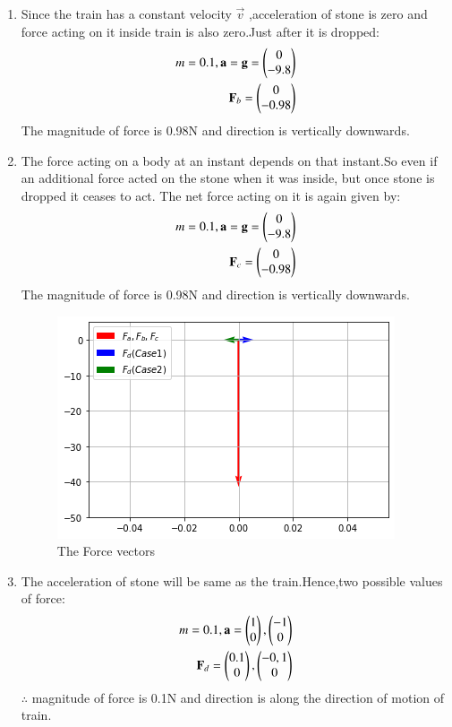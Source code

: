 \documentclass[journal,12pt,twocolumn]{IEEEtran}
\begin{document}
\begin{enumerate}[label=(\alph*)]
   \item
   Since the train has a constant velocity $\vec{v}$ ,acceleration of stone is zero and force acting on it inside train is also zero.Just after it is dropped:
   \begin{align}
        m=0.1,
        \mathbf{a}=\mathbf{g}=\begin{pmatrix}0\\-9.8\end{pmatrix}\\
        \mathbf{F}_{b}=\begin{pmatrix}0\\-0.98\end{pmatrix}
        \end{align}
   The magnitude of force is 0.98N and direction is vertically downwards. 
   \item
  The force acting on a body at an instant depends on that instant.So even if an additional force acted on the stone when it was inside,
   but once stone is dropped it ceases to act. The net force acting on it is again given by:
   \begin{align}
        m=0.1,
        \mathbf{a}=\mathbf{g}=\begin{pmatrix}0\\-9.8\end{pmatrix}\\
        \mathbf{F}_{c}=\begin{pmatrix}0\\-0.98\end{pmatrix}
        \end{align}
    The magnitude of force is 0.98N and direction is vertically downwards.
    \begin{figure}[!ht]
    \centering
    \includegraphics[width=\columnwidth]{figure7}
    \caption{The Force vectors }
    \label{fig:vectors}	
    \end{figure}
    \item The acceleration of stone will be same as the train.Hence,two possible values of force:
    \begin{align}
        m=0.1,
        \mathbf{a}=\begin{pmatrix}1\\0\end{pmatrix},\begin{pmatrix}-1\\0\end{pmatrix}\\
        \mathbf{F}_{d}=\begin{pmatrix}0.1\\0\end{pmatrix},\begin{pmatrix}-0,1\\0\end{pmatrix}
        \end{align}
    $\therefore$ magnitude of force is 0.1N and direction is along the direction of motion of train.
\end{enumerate}
\end{document}
